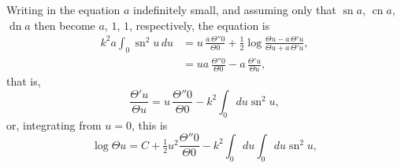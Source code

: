 \documentclass[12pt,a4paper]{article}
\begin{document}
Writing in the equation $a$ indefinitely small, and assuming only that $\operatorname{sn} a$, $\operatorname{cn} a$, $\operatorname{dn} a$ then become $a$, $1$, $1$, respectively, the equation is
\begin{align*}
k^2 a \int_0 \operatorname{sn}^2 u\, du &= u\, \frac{a\, \Theta''0}{\Theta 0} + \tfrac{1}{2}\log \frac{\Theta u - a\, \Theta' u}{\Theta u + a\, \Theta' u}, \\
&= ua\, \frac{\Theta''0}{\Theta 0} - a\, \frac{\Theta' u}{\Theta u},
\end{align*}
that is,
\[
\frac{\Theta' u}{\Theta u} = u\, \frac{\Theta''0}{\Theta 0} - k^2 \int_0 du \operatorname{sn}^2 u,
\]
or, integrating from $u = 0$, this is
\[
\log \Theta u = C + \tfrac{1}{2}u^2 \frac{\Theta''0}{\Theta 0} - k^2 \int_0 du \int_0 du \operatorname{sn}^2 u,
\]
\end{document}
